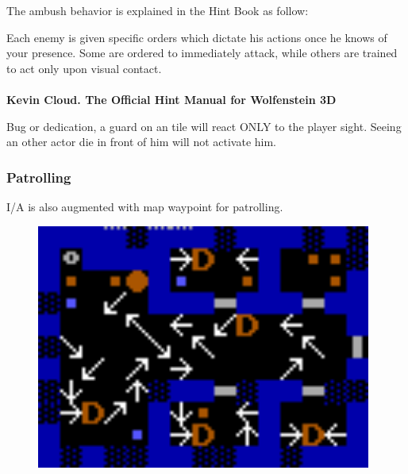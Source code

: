 \par

 The ambush behavior is explained in the Hint Book as follow:\\
\par
\begin{fancyquotes}
Each enemy is given specific orders which dictate his actions once he knows of your presence. Some are ordered to immediately attack, while others are trained to act only upon visual contact.
 \bigskip \\
\bigskip \\
\textbf{Kevin Cloud. The Official Hint Manual for Wolfenstein 3D}
 \end{fancyquotes}
\par
{} Bug or dedication, a guard on an  tile will react ONLY to the player sight. Seeing an other actor die in front of him will not activate him.\\


\subsubsection{Patrolling}
I/A is also augmented with map waypoint for patrolling.\\
\par
{}
\par
\begin{figure}[H]
 \centering
 \includegraphics[width=0.98\textwidth]{imgs/drawings/path.png}
\end{figure}
\par







